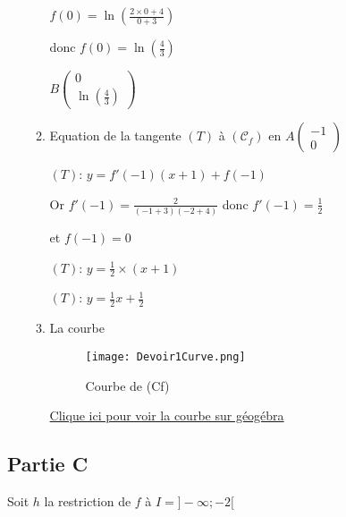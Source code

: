 \documentclass[12pt,a4paper]{article}
\begin{document}
\begin{enumerate}
\begin{enumerate}
    \( f(0) = \ln\left( \frac{2 \times 0+4}{0+3} \right) \)

donc \( f(0) = \ln\left( \frac{4}{3} \right) \)

$ B \begin{pmatrix} 0 \\ \ln\left( \frac{4}{3} \right) \end{pmatrix} $

\item Equation de la tangente \( (T) \) à \( (\mathcal{C}_{f}) \) en \( A\begin{pmatrix} -1 \\ 0 \end{pmatrix} \)

\( (T) \): \( y = f'(-1) (x+1)  + f(-1) \)

Or \( f'(-1) = \frac{2}{(-1+3)(-2+4)} \) donc \( f'(-1) = \frac{1}{2} \)

et \( f(-1) = 0 \)

\( (T) \): \( y = \frac{1}{2} \times (x+1) \)

\( (T) \): \( y = \frac{1}{2}x+\frac{1}{2} \)
\item La courbe 
\begin{center}
\begin{figure}[H]%
\centering
\texttt{[image: Devoir1Curve.png]}
\caption{Courbe de (Cf)}
\label{fig:monimage}
\end{figure}
\href{https://www.geogebra.org/classic/ud3zvetx}{Clique ici pour voir la courbe sur géogébra}\\
\end{center}
\end{enumerate}

\end{enumerate}

\subsection*{Partie C}

Soit \( h \) la restriction de \( f \) à \( I = ]-\infty; -2 [ \)
\end{document}
